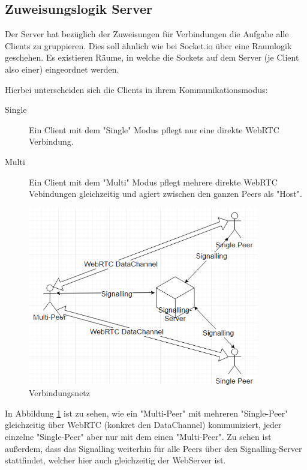 \subsection{Zuweisungslogik Server}
Der Server hat bezüglich der Zuweisungen für Verbindungen die Aufgabe alle 
Clients zu gruppieren. Dies soll ähnlich wie bei Socket.io über eine Raumlogik 
geschehen. Es existieren Räume, in welche die Sockets auf dem Server (je Client 
also einer) eingeordnet werden.


Hierbei unterscheiden sich die Clients in ihrem Kommunikationsmodus:
\begin{description}
\item[Single]
Ein Client mit dem "Single" Modus pflegt nur eine direkte WebRTC Verbindung.

\item[Multi]
Ein Client mit dem "Multi" Modus pflegt mehrere direkte WebRTC Vebindungen 
gleichzeitig und agiert zwischen den ganzen Peers als "Host".
\end{description}

\begin{figure}[ht]
\centering
\includegraphics[width=0.9\textwidth]{backend/ConnectionBetweenPeers.PNG}
\caption{Verbindungsnetz}
\label{backfig1}
\end{figure}

In Abbildung \ref{backfig1} ist zu sehen, wie ein "Multi-Peer" mit mehreren 
"Single-Peer" gleichzeitig über WebRTC (konkret den DataChannel) kommuniziert, 
jeder einzelne "Single-Peer" aber nur mit dem einen "Multi-Peer". Zu sehen ist 
außerdem, dass das Signalling weiterhin für alle Peers über den 
Signalling-Server stattfindet, welcher hier auch gleichzeitig der WebServer ist.



